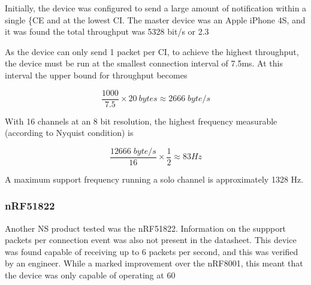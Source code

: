 \documentclass[]{article}
\begin{document}
{Initially, the device was configured to send a large amount of notification within a single \{CE} and at the lowest \ac{CI}. The master device was an Apple iPhone 4S, and it was found the total throughput was 5328 bit/s or 2.3%



As the device can only send 1 packet per \ac{CI}, to achieve the highest throughput, the device must be run at the smallest connection interval of 7.5ms. At this interval the upper bound for throughput becomes

\begin{displaymath}
\frac{1000}{7.5} \times 20\:bytes \approx 2666\;byte/s
\end{displaymath}

With 16 channels at an 8 bit resolution, the highest frequency measurable (according to Nyquist condition) is 

\begin{displaymath}
\frac{1 2666\; byte/s}{16} \times \frac{1}{2} \approx 83  Hz
\end{displaymath}

A maximum support frequency running a solo channel is approximately 1328 Hz.

\subsubsection{nRF51822}
Another \ac{NS} product tested was the nRF51822. Information on the suppport packets per connection event was also not present in the datasheet\cite{nrf51822}. This device was found capable of receiving up to 6 packets per second, and this was verified by an engineer\cite{olme}. While a marked improvement over the nRF8001, this meant that the device was only capable of operating at 60%
\end{document}

